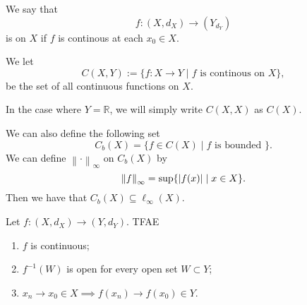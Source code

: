 \documentclass[notoc,notitlepage]{tufte-book}
\newcommand{\norm}[1]{\left\| #1 \right\|}
\begin{document}
\begin{defn}\label{defn:continuity_on_a_space}
  We say that
  \begin{equation*}
    f : (X, d_X) \to (Y_ d_Y)
  \end{equation*}
  is  on $X$ if $f$ is continous at each $x_0 \in X$.
  
  We let
  \begin{equation*}
    C(X, Y) := \{ f : X \to Y \mid f \text{ is continous on } X \},
  \end{equation*}
  be the set of all continuous functions on $X$.
\end{defn}

\begin{note}
  In the case where $Y = \mathbb{R}$, we will simply write $C(X, X)$ as $C(X)$.
\end{note}

\begin{remark}
  We can also define the following set
  \begin{equation*}
    C_b(X) = \{ f \in C(X) \mid f \text{ is bounded } \}.
  \end{equation*}
  We can define $\norm\cdot_\infty$ on $C_b(X)$ by
  \begin{equation*}
    \norm{f}_\infty = \sup \{ \abs{ f(x) } \mid x \in X \}.
  \end{equation*}
  Then we have that $C_b(X) \subseteq \ell_\infty(X)$.
\end{remark}

\begin{thm}\label{thm:analogue_of_sequential_characterization_of_continuity_on_a_space_and_continuity_and_neighbourhoods}
  Let $f: (X, d_X) \to (Y, d_Y)$. TFAE
  \begin{enumerate}
    \item $f$ is continuous;
    \item $f^{-1}(W)$ is open for every open set $W \subset Y$;
    \item $x_n \to x_0 \in X \implies f(x_n) \to f(x_0) \in Y$.
  \end{enumerate}
\end{thm}
\end{document}
